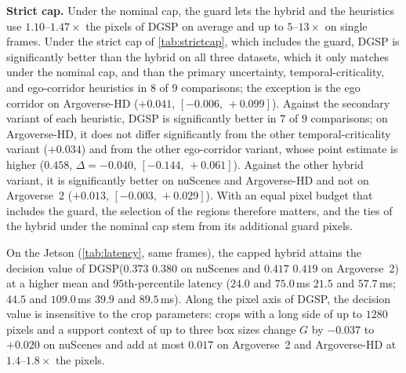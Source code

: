 \documentclass[10pt,letterpaper]{article}
\newcommand{\method}{DGSP\xspace}
\newcommand{\G}{G}
\newcommand{\ci}[2]{[#1,\allowbreak\,#2]}
\theoremstyle{remark}
\theoremstyle{plain}
\theoremstyle{definition}
\begin{document}
\noindent\textbf{Strict cap.}
Under the nominal cap, the guard lets the hybrid and the heuristics use $1.10$--$1.47\times$ the pixels of \method on average and up to $5$--$13\times$ on single frames.
Under the strict cap of \cref{tab:strictcap}, which includes the guard, \method is significantly better than the hybrid on all three datasets, which it only matches under the nominal cap, and than the primary uncertainty, temporal-criticality, and ego-corridor heuristics in $8$ of $9$ comparisons; the exception is the ego corridor on Argoverse-HD ($+0.041$, $\ci{-0.006}{+0.099}$).
Against the secondary variant of each heuristic, \method is significantly better in $7$ of $9$ comparisons; on Argoverse-HD, it does not differ significantly from the other temporal-criticality variant ($+0.034$) and from the other ego-corridor variant, whose point estimate is higher ($0.458$, $\Delta=-0.040$, $\ci{-0.144}{+0.061}$). Against the other hybrid variant, it is significantly better on nuScenes and Argoverse-HD and not on Argoverse~2 ($+0.013$, $\ci{-0.003}{+0.029}$).
With an equal pixel budget that includes the guard, the selection of the regions therefore matters, and the ties of the hybrid under the nominal cap stem from its additional guard pixels.

On the Jetson (\cref{tab:latency}, same frames), the capped hybrid attains the decision value of \method ($0.373$ \vs $0.380$ on nuScenes and $0.417$ \vs $0.419$ on Argoverse~2) at a higher mean and $95$th-percentile latency ($24.0$ and $75.0$\,ms \vs $21.5$ and $57.7$\,ms; $44.5$ and $109.0$\,ms \vs $39.9$ and $89.5$\,ms).
Along the pixel axis of \method, the decision value is insensitive to the crop parameters: crops with a long side of up to $1280$ pixels and a support context of up to three box sizes change $\G$ by $-0.037$ to $+0.020$ on nuScenes and add at most $0.017$ on Argoverse~2 and Argoverse-HD at $1.4$--$1.8\times$ the pixels.
\end{document}
